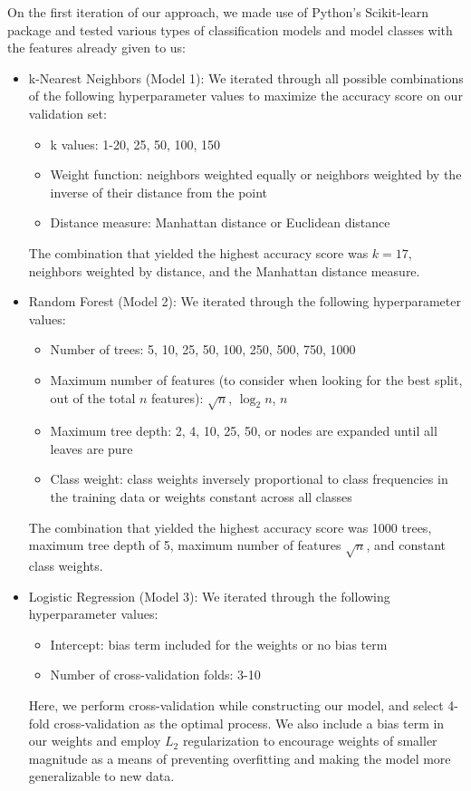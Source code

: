 \documentclass[11pt]{article}
\begin{document}
  On the first iteration of our approach, we made use of Python's Scikit-learn package and tested various types of classification models and model classes with the features already given to us:
  \begin{itemize}
      \item k-Nearest Neighbors (Model 1): We iterated through all possible combinations of the following hyperparameter values to maximize the accuracy score on our validation set:
      \begin{itemize}
          \item k values: 1-20, 25, 50, 100, 150
          \item Weight function: neighbors weighted equally or neighbors weighted by the inverse of their distance from the point
          \item Distance measure: Manhattan distance or Euclidean distance
      \end{itemize}
      The combination that yielded the highest accuracy score was $k=17$, neighbors weighted by distance, and the Manhattan distance measure.
      
      \item Random Forest (Model 2): We iterated through the following hyperparameter values:
      \begin{itemize}
          \item Number of trees: 5, 10, 25, 50, 100, 250, 500, 750, 1000
          \item Maximum number of features (to consider when looking for the best split, out of the total $n$ features): $\sqrt{n}$, $\log_2{n}$, $n$  
          \item Maximum tree depth: 2, 4, 10, 25, 50, or nodes are expanded until all leaves are pure
          \item Class weight: class weights inversely proportional to class frequencies in the training data or weights constant across all classes
      \end{itemize}
      The combination that yielded the highest accuracy score was 1000 trees, maximum tree depth of 5, maximum number of features $\sqrt{n}$, and constant class weights. 
      
      \item Logistic Regression (Model 3): We iterated through the following hyperparameter values:
      \begin{itemize}
          \item Intercept: bias term included for the weights or no bias term
          \item Number of cross-validation folds: 3-10
      \end{itemize}
      Here, we perform cross-validation while constructing our model, and select 4-fold cross-validation as the optimal process. We also include a bias term in our weights and employ $L_2$ regularization to encourage weights of smaller magnitude as a means of preventing overfitting and making the model more generalizable to new data.
      

\end{itemize}
\end{document}

